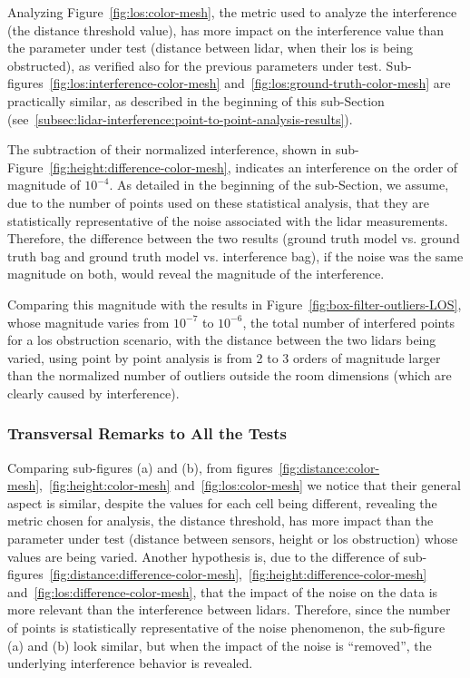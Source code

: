 Analyzing Figure~\ref{fig:los:color-mesh}, the metric used to analyze the interference (the distance threshold value), has more impact on the interference value than the parameter under test (distance between \ac{lidar}, when their \ac{los} is being obstructed), as verified also for the previous parameters under test. Sub-figures~\ref{fig:los:interference-color-mesh} and~\ref{fig:los:ground-truth-color-mesh} are practically similar, as described in the beginning of this sub-Section (see~\ref{subsec:lidar-interference:point-to-point-analysis-results}).

The subtraction of their normalized interference, shown in sub-Figure~\ref{fig:height:difference-color-mesh}, indicates an interference on the order of magnitude of $10^{-4}$. As detailed in the beginning of the sub-Section, we assume, due to the number of points used on these statistical analysis, that they are statistically representative of the noise associated with the \ac{lidar} measurements. Therefore, the difference between the two results (ground truth model vs. ground truth bag and ground truth model vs. interference bag), if the noise was the same magnitude on both, would reveal the magnitude of the interference. 

Comparing this magnitude with the results in Figure~\ref{fig:box-filter-outliers-LOS}, whose magnitude varies from $10^{-7}$ to $10^{-6}$, the total number of interfered points for a \ac{los} obstruction scenario, with the distance between the two \acp{lidar} being varied, using point by point analysis is from 2 to 3 orders of magnitude larger than the normalized number of outliers outside the room dimensions (which are clearly caused by interference).


\subsubsection{Transversal Remarks to All the Tests}
Comparing sub-figures (a) and (b), from figures~\ref{fig:distance:color-mesh},~\ref{fig:height:color-mesh} and~\ref{fig:los:color-mesh} we notice that their general aspect is similar, despite the values for each cell being different, revealing the metric chosen for analysis, the distance threshold, has
more impact than the parameter under test (distance between sensors, height or \ac{los} obstruction) whose values are being varied. Another hypothesis is, due to the difference of sub-figures~\ref{fig:distance:difference-color-mesh},~\ref{fig:height:difference-color-mesh} and~\ref{fig:los:difference-color-mesh}, that the impact of the noise on the data is more relevant than the interference between \acp{lidar}. Therefore, since the number of points is statistically representative of the noise phenomenon, the sub-figure (a) and (b) look similar, but when the impact of the noise is ``removed'', the underlying interference behavior is revealed. 

